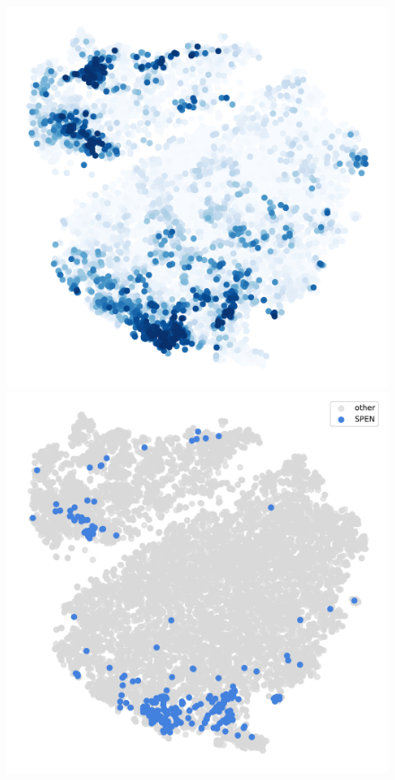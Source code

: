 \begin{figure}[h]
	\endminipage\hfill
		\includegraphics[width=\linewidth]{figures/appendix/tsne_probability_nocolorbar_nuclear}
		\vfill
		\includegraphics[width=\linewidth]{figures/appendix/tsne_nuclear_SPEN}

\end{figure}
